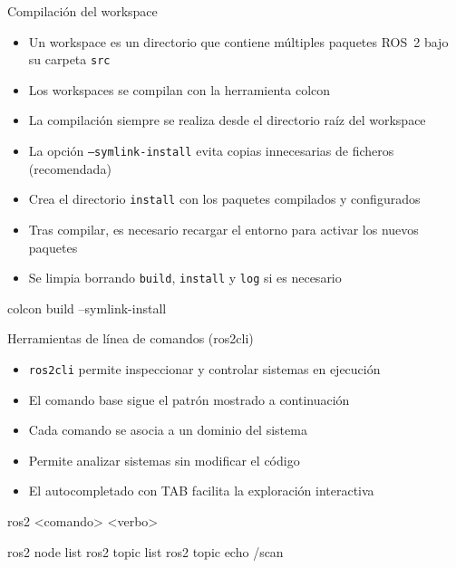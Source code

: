 \documentclass[aspectratio=169]{beamer}
\begin{document}
\begin{frame}[fragile]{Compilación del workspace}
\small
\begin{itemize}
  \item Un workspace es un directorio que contiene múltiples paquetes ROS~2 bajo su carpeta \texttt{src}
  \item Los workspaces se compilan con la herramienta colcon
  \item La compilación siempre se realiza desde el directorio raíz del workspace
  \item La opción \texttt{--symlink-install} evita copias innecesarias de ficheros (recomendada)
  \item Crea el directorio \texttt{install} con los paquetes compilados y configurados
  \item Tras compilar, es necesario recargar el entorno para activar los nuevos paquetes
  \item Se limpia borrando \texttt{build}, \texttt{install} y \texttt{log} si es necesario
\end{itemize}
\vspace{2mm}
\begin{terminal}
colcon build --symlink-install
\end{terminal}
\end{frame}

\begin{frame}[fragile]{Herramientas de línea de comandos (ros2cli)}
\small
\begin{itemize}
  \item \texttt{ros2cli} permite inspeccionar y controlar sistemas en ejecución
  \item El comando base sigue el patrón mostrado a continuación
  \item Cada comando se asocia a un dominio del sistema
  \item Permite analizar sistemas sin modificar el código
  \item El autocompletado con TAB facilita la exploración interactiva
\end{itemize}
\vspace{2mm}
\begin{terminal}
ros2 <comando> <verbo>

ros2 node list
ros2 topic list
ros2 topic echo /scan
\end{terminal}
\end{frame}
\end{document}
